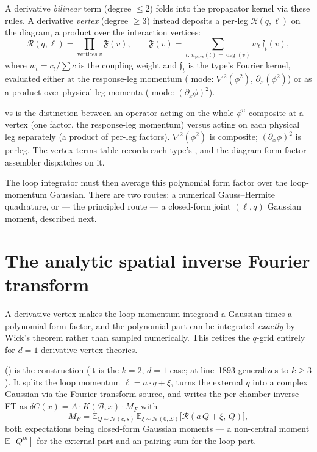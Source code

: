 A derivative \emph{bilinear} term (degree $\le2$) folds into the propagator
kernel via these rules. A derivative \emph{vertex} (degree $\ge3$) instead
deposits a per-leg  $\mathcal{R}(q,\ell)$ on the diagram, a
product over the interaction vertices:
\begin{equation}
  \mathcal{R}(q,\ell)=\prod_{\text{vertices }v}\mathfrak{F}(v),
  \qquad
  \mathfrak{F}(v)=\sum_{t:\,n_{\text{phys}}(t)=\deg(v)}w_{t}\,\mathfrak{f}_{t}(v),
  \label{eq:Rcal}
\end{equation}
where $w_{t}=c_{t}/\sum c$ is the coupling weight and $\mathfrak{f}_{t}$ is the
type's Fourier kernel, evaluated either at the response-leg momentum
( mode: $\nabla^{2}(\phi^{2})$, $\partial_{x}(\phi^{2})$) or as a
product over physical-leg momenta ( mode: $(\partial_{x}\phi)^{2}$).

\begin{defn}
 vs  is the distinction between an operator acting
on the whole $\phi^{n}$ composite at a vertex (one factor, the response-leg
momentum) versus acting on each physical leg separately (a product of per-leg
factors). $\nabla^{2}(\phi^{2})$ is composite; $(\partial_{x}\phi)^{2}$ is
perleg. The vertex-terms table records each type's , and the diagram
form-factor assembler dispatches on it.
\end{defn}

The loop integrator must then average this polynomial form factor over the
loop-momentum Gaussian. There are two routes: a numerical Gauss--Hermite
quadrature, or --- the principled route --- a closed-form joint $(\ell,q)$
Gaussian moment, described next.

\section{The analytic spatial inverse Fourier transform}

A derivative vertex makes the loop-momentum integrand a Gaussian times a
polynomial form factor, and the polynomial part can be integrated \emph{exactly}
by Wick's theorem rather than sampled numerically. This retires the
$q$-grid entirely for $d=1$ derivative-vertex theories.

 () is
the construction (it is the $k=2$, $d=1$ case; 
at line~1893 generalizes to $k\ge3$). It splits the loop momentum
$\ell=a\cdot q+\xi$, turns the external $q$ into a complex Gaussian via the
Fourier-transform source, and writes the per-chamber inverse FT as
$\delta C(x)=A\cdot K(\mathcal{B},x)\cdot M_{F}$ with
\begin{equation}
  M_{F}=\mathbb{E}_{Q\sim\mathcal{N}(c,s)}\,
        \mathbb{E}_{\xi\sim\mathcal{N}(0,\Sigma)}
        \big[\mathcal{R}(a\,Q+\xi,\,Q)\big],
  \label{eq:MF}
\end{equation}
both expectations being closed-form Gaussian moments --- a non-central moment
$\mathbb{E}[Q^{m}]$ for the external part and an  pairing sum for
the loop part.

